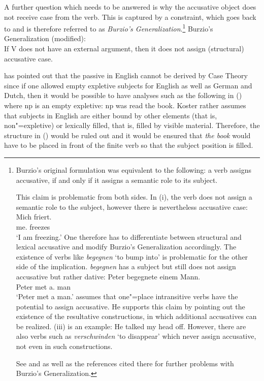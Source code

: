 A further question which needs to be answered is why the accusative object does not receive case from the verb.
This is captured by a constraint, which goes back to \citet[--185]{Burzio86a-u-gekauft} and is therefore
referred to as \emph{Burzio's Generalization}.\footnote{
Burzio's original formulation was equivalent to the following: a verb assigns accusative, if and only if it assigns
a semantic role to its subject.

This claim is problematic from both sides. In (i), the verb does not assign a semantic role to the subject, however
there is nevertheless accusative case:
\ea
\gll Mich friert.\\
	 me.\acc{} freezes\\
\glt `I am freezing.'
\z
One therefore has to differentiate between structural and lexical accusative and modify Burzio's Generalization
accordingly. The existence of verbs like \emph{begegnen} `to bump into' is problematic for the other side of
the implication. \emph{begegnen} has a subject but still does not assign accusative but rather
dative:
\ea
\gll Peter begegnete einem Mann.\\
     Peter met a.\dat{} man\\
\glt `Peter met a man.'
\z
\citet[]{Burzio86a-u-gekauft} assumes that one"=place intransitive verbs have the potential to assign
accusative. He supports this claim by pointing out the existence of the resultative
constructions, in which additional accusatives can be realized. (iii) is
an example:
\ea
He talked my head off.
\z
However, there are also verbs such as \emph{verschwinden} `to disappear' which never assign
accusative, not even in such constructions.

See  and  as well as the references cited there for further problems
with Burzio's Generalization.
}
\ea
Burzio's Generalization (modified):\\
If V does not have an external argument, then it does not assign (structural) accusative case.
\z

\noindent
\citet[]{Koster86a} has pointed out that the passive in English cannot be derived by Case
Theory since if one allowed empty expletive subjects for English as well as German and Dutch, then it would be possible
to have analyses such as the following in () where np is an empty expletive:
\ea
np was read the book.
\z
Koster rather assumes that subjects in English are either bound by other elements (that is, non"=expletive) or lexically filled, that
is, filled by visible material.
Therefore, the structure in () would be ruled out and it would be ensured that \emph{the book} would have to be placed in front
of the finite verb so that the subject position is filled.

